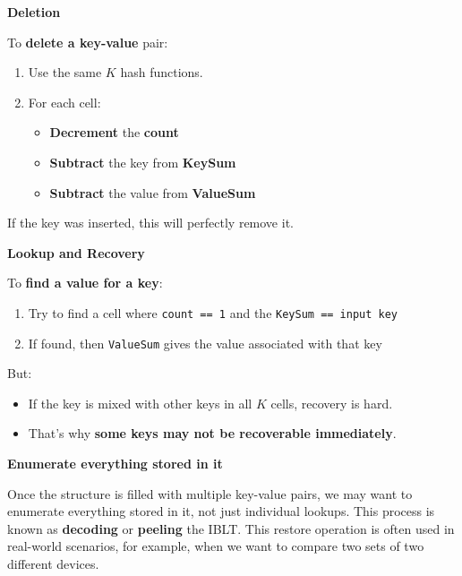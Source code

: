 \newpage

\begin{flushleft}
    \textcolor{Green3}{ \textbf{Deletion}}
\end{flushleft}
To \textbf{delete a key-value} pair:
\begin{enumerate}
    \item Use the same $K$ hash functions.
    \item For each cell:
    \begin{itemize}
        \item \textbf{Decrement} the \textbf{count}
        \item \textbf{Subtract} the key from \textbf{KeySum}
        \item \textbf{Subtract} the value from \textbf{ValueSum}
    \end{itemize}
\end{enumerate}
If the key was inserted, this will perfectly remove it.

\highspace
\begin{flushleft}
    \textcolor{Green3}{ \textbf{Lookup and Recovery}}
\end{flushleft}
To \textbf{find a value for a key}:
\begin{enumerate}
    \item Try to find a cell where \texttt{count == 1} and the \texttt{KeySum == input key}
    \item If found, then \texttt{ValueSum} gives the value associated with that key
\end{enumerate}
But:
\begin{itemize}
    \item If the key is mixed with other keys in all $K$ cells, recovery is hard.
    \item That's why \textbf{some keys may not be recoverable immediately}.
\end{itemize}

\highspace
\begin{flushleft}
    \textcolor{Green3}{ \textbf{Enumerate everything stored in it}}
\end{flushleft}
Once the structure is filled with multiple key-value pairs, we may want to enumerate everything stored in it, not just individual lookups. This process is known as \textbf{decoding} or \textbf{peeling} the IBLT. This restore operation is often used in real-world scenarios, for example, when we want to compare two sets of two different devices.

